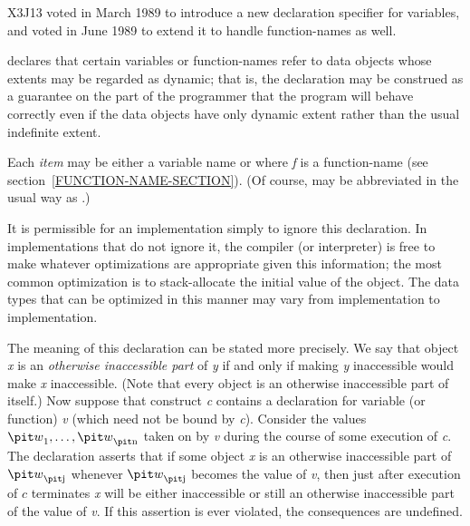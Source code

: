 \begin{newer}
X3J13 voted in March 1989  to introduce a new
declaration specifier  for variables,
and voted in June 1989 
to extend it to handle function-names as well.
\begin{flushdesc}
\item[\cd{dynamic-extent}]

declares that certain variables or function-names refer to data objects
whose extents may be regarded as dynamic; that is, the declaration
may be construed as a guarantee on the part of the programmer that
the program will behave correctly even if the data objects have only
dynamic extent rather than the usual indefinite extent.

Each {\it item} may be either a variable name or 
where {\it f} is a function-name (see section~\ref{FUNCTION-NAME-SECTION}).
(Of course,  may be abbreviated in the usual way
as .)

  It is permissible for an implementation simply to ignore this declaration.
  In implementations that do not ignore it, the compiler (or interpreter)
  is free to make whatever optimizations are appropriate given this
  information; the most common optimization is to stack-allocate the
  initial value of the object. The data types that can be optimized in this manner
  may vary from implementation to implementation.

The meaning of this declaration can be stated more precisely.
We say that
object {\it x} is an {\it otherwise inaccessible part}
    of {\it y} if and only if making {\it y} inaccessible would make {\it x} inaccessible.
    (Note that every object is an otherwise inaccessible part of itself.)
  Now suppose that construct {\it c} contains a  declaration for
  variable (or function) {\it v} (which need not be bound by {\it c}).  Consider the values
  ${\it w}_1, \ldots, {\it w}_{\hbox{\scriptsize\it n}}$ taken on by {\it v} during the course of some execution of
  {\it c}.  The declaration asserts that if some object {\it x}
  is an otherwise inaccessible part of ${\it w}_{\hbox{\scriptsize\it j}}$
  whenever ${\it w}_{\hbox{\scriptsize\it j}}$ becomes the value of {\it v},
  then just after execution of
  $c$ terminates {\it x} will be either inaccessible or
  still an otherwise inaccessible part of the value of {\it v}.
  If this assertion is ever violated, the consequences are undefined.


\end{flushdesc}
\end{newer}
